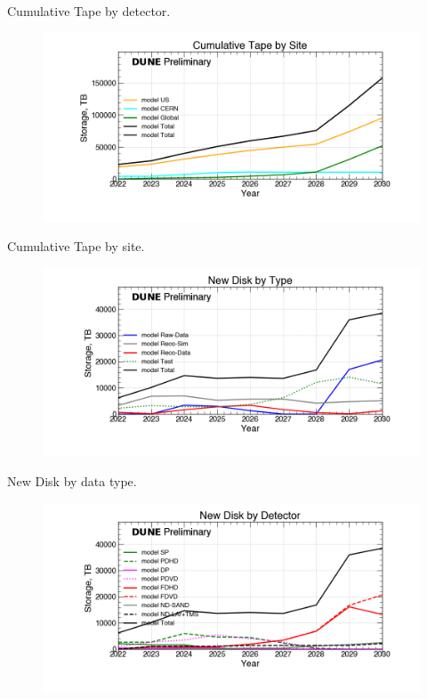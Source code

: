 \begin{table}[h]
\label{tab:TapeByYearByType}
\caption{Cumulative Tape by detector.}
\end{table}
\pagebreak
\begin{figure}[ht]
\centering\includegraphics[height=0.4\textwidth]{Feb24_noMWC_Cumulative-Tape-by-Site-Storage.png}\end{figure}
\begin{table}[h]
\label{tab:TapeByYearByType}
\caption{Cumulative Tape by site.}
\end{table}
\pagebreak
\begin{figure}[ht]
\centering\includegraphics[height=0.4\textwidth]{Feb24_noMWC_New-Disk-by-Type-Storage.png}\end{figure}
\begin{table}[h]
\label{tab:DiskByYearByType}
\caption{New Disk by data type.}
\end{table}
\pagebreak
\begin{figure}[ht]
\centering\includegraphics[height=0.4\textwidth]{Feb24_noMWC_New-Disk-by-Detector-Storage.png}\end{figure}
